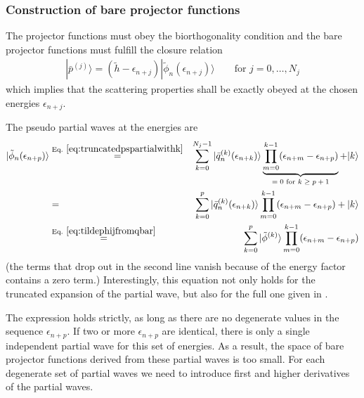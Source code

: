 \documentclass[11pt,a4paper]{report}
\begin{document}
\subsubsection{Construction of bare projector functions}
The projector functions must obey the biorthogonality condition and
the bare projector functions must fulfill the closure relation
\begin{eqnarray}
|\bar{p}^{(j)}\rangle=(\tilde{h}-\epsilon_{n+j})
|\tilde{\phi}_n(\epsilon_{n+j})\rangle \qquad\text{for $j=0,\ldots,N_j$}
\end{eqnarray}
which implies that the scattering properties shall be exactly obeyed at
the chosen energies $\epsilon_{n+j}$.

The pseudo partial waves at the energies are
\begin{eqnarray}
|\tilde{\phi}_n(\epsilon_{n+p})\rangle
&\eqrel{eq:truncatedpspartialwithk}{=}&
\sum_{k=0}^{N_j-1}|\bar{q}_n^{(k)}(\epsilon_{n+k})\rangle
\underbrace{\prod_{m=0}^{k-1}(\epsilon_{n+m}-\epsilon_{n+p})}
_{\text{$=0$ for $k\ge p+1$}}+|k\rangle
\nonumber\\
&=&\sum_{k=0}^{p}|\bar{q}_n^{(k)}(\epsilon_{n+k})\rangle
\prod_{m=0}^{k-1}(\epsilon_{n+m}-\epsilon_{n+p})+|k\rangle
\nonumber\\
&\eqrel{eq:tildephijfromqbar}{=}&\sum_{k=0}^{p}|\tilde{\phi}^{(k)}\rangle
\prod_{m=0}^{k-1}(\epsilon_{n+m}-\epsilon_{n+p})
\label{eq:tildepsienplusp}
\end{eqnarray}
(the terms that drop out in the second line vanish because of the
energy factor contains a zero term.) Interestingly, this equation not
only holds for the truncated expansion of the partial wave, but also
for the full one given in .

The expression  holds strictly, as long as there
are no degenerate values in the sequence $\epsilon_{n+p}$. If two or
more $\epsilon_{n+p}$ are identical, there is only a single
independent partial wave for this set of energies. As a result, the
space of bare projector functions derived from these partial waves is
too small. For each degenerate set of partial waves we need to
introduce first and higher derivatives of the partial waves.
\end{document}

